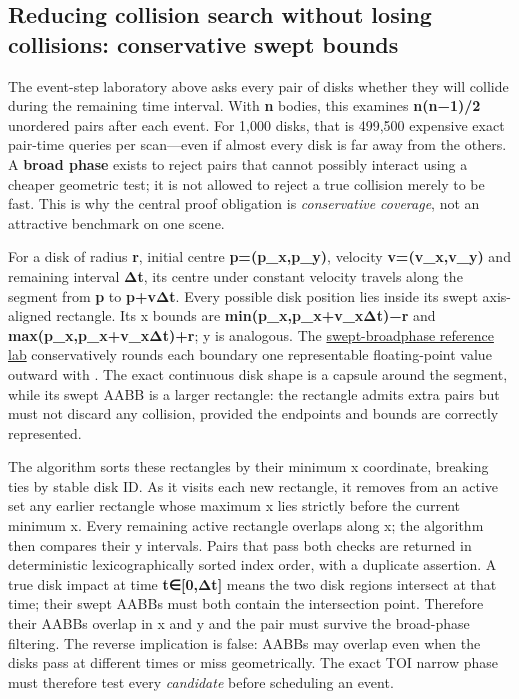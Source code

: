 \subsection{Reducing collision search without losing collisions: conservative swept bounds}\label{appendix-c9d92e145503-reducing-collision-search-without-losing-collisions-conservative-swept-bounds}

\hypertarget{appendix-c9d92e145503-reducing-collision-search-without-losing-collisions-conservative-swept-bounds}{}

The event-step laboratory above asks every pair of disks whether they will collide during the remaining time interval. With \textbf{n} bodies, this examines \textbf{n(n−1)/2} unordered pairs after each event. For 1,000 disks, that is 499,500 expensive exact pair-time queries per scan---even if almost every disk is far away from the others. A \textbf{broad phase} exists to reject pairs that cannot possibly interact using a cheaper geometric test; it is not allowed to reject a true collision merely to be fast. This is why the central proof obligation is \emph{conservative coverage}, not an attractive benchmark on one scene.

For a disk of radius \textbf{r}, initial centre \textbf{p=(p\_x,p\_y)}, velocity \textbf{v=(v\_x,v\_y)} and remaining interval \textbf{Δt}, its centre under constant velocity travels along the segment from \textbf{p} to \textbf{p+vΔt}. Every possible disk position lies inside its swept axis-aligned rectangle. Its x bounds are \textbf{min(p\_x,p\_x+v\_xΔt)−r} and \textbf{max(p\_x,p\_x+v\_xΔt)+r}; y is analogous. The \hyperref[source-file-6597829be009fc0bb1b17d87]{swept-broadphase reference lab} conservatively rounds each boundary one representable floating-point value outward with . The exact continuous disk shape is a capsule around the segment, while its swept AABB is a larger rectangle: the rectangle admits extra pairs but must not discard any collision, provided the endpoints and bounds are correctly represented.

The algorithm sorts these rectangles by their minimum x coordinate, breaking ties by stable disk ID. As it visits each new rectangle, it removes from an active set any earlier rectangle whose maximum x lies strictly before the current minimum x. Every remaining active rectangle overlaps along x; the algorithm then compares their y intervals. Pairs that pass both checks are returned in deterministic lexicographically sorted index order, with a duplicate assertion. A true disk impact at time \textbf{t∈{[}0,Δt{]}} means the two disk regions intersect at that time; their swept AABBs must both contain the intersection point. Therefore their AABBs overlap in x and y and the pair must survive the broad-phase filtering. The reverse implication is false: AABBs may overlap even when the disks pass at different times or miss geometrically. The exact TOI narrow phase must therefore test every \emph{candidate} before scheduling an event.

